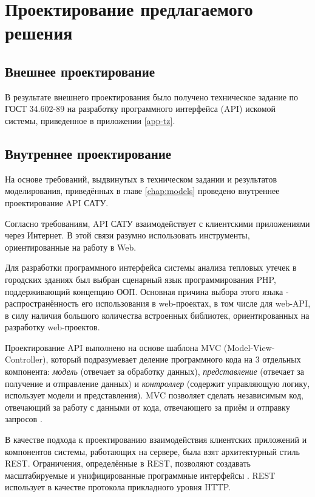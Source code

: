 \chapter{Проектирование предлагаемого решения}
\label{chap:design}

\section{Внешнее проектирование}

\par
	В результате внешнего проектирования было получено техническое задание по ГОСТ 34.602-89 на разработку программного интерфейса (API) искомой системы, приведенное в приложении \ref{app-tz}.

\section{Внутреннее проектирование}

\par

	На основе требований, выдвинутых в техническом задании и результатов моделирования, приведённых в главе \ref{chap:models} проведено внутреннее проектирование API САТУ.

	Согласно требованиям, API САТУ взаимодействует с клиентскими приложениями через Интернет. В этой связи разумно использовать инструменты, ориентированные на работу в Web.

	Для разработки программного интерфейса системы анализа тепловых утечек в городских зданиях был выбран сценарный язык программирования PHP, поддерживающий концепцию ООП. Основная причина выбора этого языка - распространённость его использования в web-проектах, в том числе для web-API, в силу наличия большого количества встроенных библиотек, ориентированных на разработку web-проектов.


\par

	Проектирование API выполнено на основе шаблона {MVC (Model-View-Controller)}, который подразумевает деление программного кода на 3 отдельных компонента: \textit{модель} (отвечает за обработку данных), \textit{представление} (отвечает за получение и отправление данных) и \textit{контроллер} (содержит управляющую логику, использует модели и представления). MVC позволяет сделать независимым код, отвечающий за работу с данными от кода, отвечающего за приём и отправку запросов \cite{design:mvc}.
	
	В качестве подхода к проектированию взаимодействия клиентских приложений и компонентов системы, работающих на сервере, была взят архитектурный стиль REST. Ограничения, определённые в REST, позволяют создавать масштабируемые и унифицированные программные интерфейсы \cite{design:rest}. REST использует в качестве протокола прикладного уровня HTTP.
	
